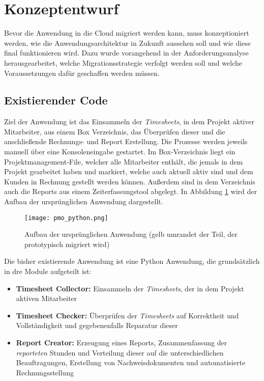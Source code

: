 \section{Konzeptentwurf}
\label{sec:konzeptentwurf}
Bevor die Anwendung in die Cloud migriert werden kann, muss konzeptioniert werden, wie die Anwendungsarchitektur in Zukunft aussehen soll und wie diese final funktionieren wird. Dazu wurde vorangehend in der Anforderungsanalyse herausgearbeitet, welche Migrationsstrategie verfolgt werden soll und welche Voraussetzungen dafür geschaffen werden müssen.

\subsection{Existierender Code}
Ziel der Anwendung ist das Einsammeln der \textit{\glspl{Timesheet}}, in dem Projekt aktiver Mitarbeiter, aus einem \gls{Box} Verzeichnis, das Überprüfen dieser und die anschließende Rechnungs- und Report Erstellung. Die Prozesse werden jeweils manuell über eine Konsoleneingabe gestartet. Im \gls{Box}-Verzeichnis liegt ein Projektmanagement-File, welcher alle Mitarbeiter enthält, die jemals in dem Projekt gearbeitet haben und markiert, welche auch aktuell aktiv sind und dem Kunden in Rechnung gestellt werden können. Außerdem sind in dem Verzeichnis auch die Reports aus einem Zeiterfassungstool abgelegt. In Abbildung \ref{fig:pmo_python} wird der Aufbau der ursprünglichen Anwendung dargestellt.

\begin{figure}[H]
    \centering
    \texttt{[image: pmo\_python.png]}
    \caption{Aufbau der ursprünglichen Anwendung (gelb umrandet der Teil, der prototypisch migriert wird)}
    \label{fig:pmo_python}
\end{figure}

Die bisher existierende Anwendung ist eine Python Anwendung, die grundsätzlich in dre Module aufgeteilt ist:
\begin{itemize}
\item \textbf{Timesheet Collector: }Einsammeln der \textit{\glspl{Timesheet}}, der in dem Projekt aktiven Mitarbeiter
\item \textbf{Timesheet Checker: }Überprüfen der \textit{\glspl{Timesheet}} auf Korrektheit und Vollständigkeit und gegebenenfalls Reparatur dieser
\item \textbf{Report Creator: }Erzeugung eines Reports, Zusammenfassung der \textit{reporteten} Stunden und Verteilung dieser auf die unterschiedlichen Beauftragungen, Erstellung von Nachweisdokumenten und automatisierte Rechnungsstellung
\end{itemize}

